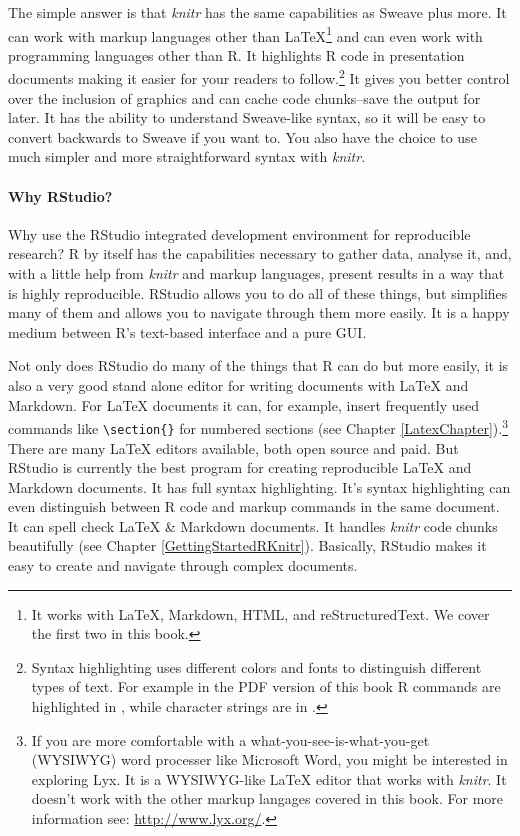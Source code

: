 The simple answer is that {\emph{knitr}} has the same capabilities as Sweave plus more. It can work with markup languages other than LaTeX\footnote{It works with LaTeX, Markdown, HTML, and reStructuredText. We cover the first two in this book.} and can even work with programming languages other than R. It highlights R code in presentation documents making it easier for your readers to follow.\footnote{Syntax highlighting uses different colors and fonts to distinguish different types of text. For example in the PDF version of this book R commands are highlighted in , while character strings are in .} It gives you better control over the inclusion of graphics and can cache code chunks--save the output for later. It has the ability to understand Sweave-like syntax, so it will be easy to convert backwards to Sweave if you want to. You also have the choice to use much simpler and more straightforward syntax with {\emph{knitr}}. 

\paragraph{Why RStudio?}

Why use the RStudio integrated development environment for reproducible research? R by itself has the capabilities necessary to gather data, analyse it, and, with a little help from {\emph{knitr}} and markup languages, present results in a way that is highly reproducible. RStudio allows you to do all of these things, but simplifies many of them and allows you to navigate through them more easily. It is a happy medium between R's text-based interface and a pure GUI. 

Not only does RStudio do many of the things that R can do but more easily, it is also a very good stand alone editor for writing documents with LaTeX and Markdown. For LaTeX documents it can, for example, insert frequently used commands like \texttt{\textbackslash{}section\{\}} for numbered sections (see Chapter \ref{LatexChapter}).\footnote{If you are more comfortable with a what-you-see-is-what-you-get (WYSIWYG) word processer like Microsoft Word, you might be interested in exploring Lyx. It is a WYSIWYG-like LaTeX editor that works with {\emph{knitr}}. It doesn't work with the other markup langages covered in this book. For more information see: \url{http://www.lyx.org/}.}  There are many LaTeX editors available, both open source and paid. But RStudio is currently the best program for creating reproducible LaTeX and Markdown documents. It has full syntax highlighting. It's syntax highlighting can even distinguish between R code and markup commands in the same document. It can spell check LaTeX \& Markdown documents. It handles {\emph{knitr}} code chunks beautifully (see Chapter \ref{GettingStartedRKnitr}). Basically, RStudio makes it easy to create and navigate through complex documents. 

